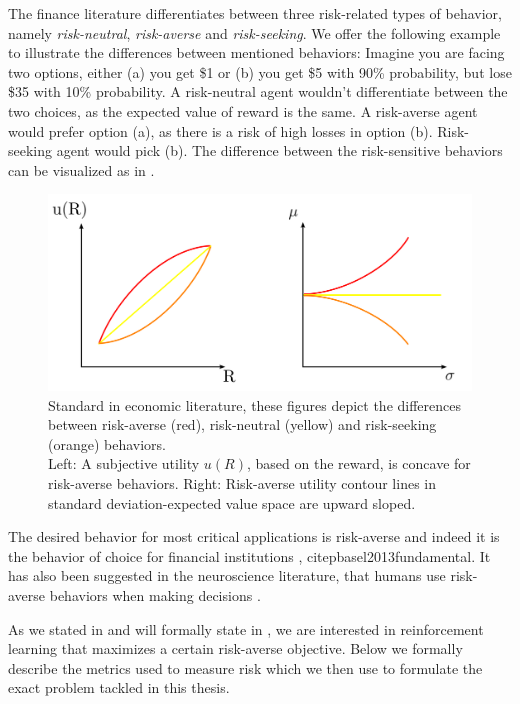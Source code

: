 The finance literature differentiates between three risk-related types of behavior, namely \textit{risk-neutral}, \textit{risk-averse} and \textit{risk-seeking}. We offer the following example to illustrate the differences between mentioned behaviors: Imagine you are facing two options, either (a) you get \$1 or (b) you get \$5 with 90\% probability, but lose \$35 with 10\% probability. A risk-neutral agent wouldn't differentiate between the two choices, as the expected value of reward is the same. A risk-averse agent would prefer option (a), as there is a risk of high losses in option (b). Risk-seeking agent would pick (b). The difference between the risk-sensitive behaviors can be visualized as in .

\begin{figure}
\center
\includegraphics[width=0.8\linewidth]{gfx/risk.pdf}
\caption{Standard in economic literature, these figures depict the differences between risk-averse (red), risk-neutral (yellow) and risk-seeking (orange) behaviors.
\\
Left: A subjective utility $u(R)$, based on the reward, is concave for risk-averse behaviors. 
Right: Risk-averse utility contour lines in standard deviation-expected value space are upward sloped.
}
\label{fig:risk}
\end{figure}

The desired behavior for most critical applications is risk-averse and indeed it is the behavior of choice for financial institutions \citep{wipplinger2007philippe}, citep{basel2013fundamental}. It has also been suggested in the neuroscience literature, that humans use risk-averse behaviors when making decisions \citep{shen2014risk}.

As we stated in  and will formally state in , we are interested in reinforcement learning that maximizes a certain risk-averse objective. Below we formally describe the metrics used to measure risk which we then use to formulate the exact problem tackled in this thesis.


